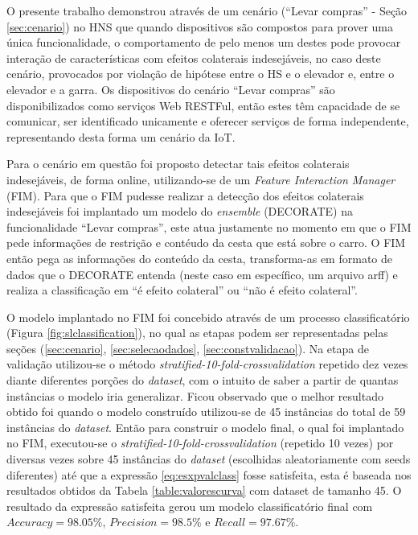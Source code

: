O presente trabalho demonstrou através de um cenário (``Levar compras'' - Seção \ref{sec:cenario}) no HNS que quando dispositivos são compostos para prover uma única funcionalidade, o comportamento de pelo menos um destes pode provocar interação de características com efeitos colaterais indesejáveis, no caso deste cenário, provocados por violação de hipótese entre o HS e o elevador e, entre o elevador e a garra. Os dispositivos do cenário ``Levar compras'' são disponibilizados como serviços Web RESTFul, então estes têm capacidade de se comunicar, ser identificado unicamente e oferecer serviços de forma independente, representando desta forma um cenário da IoT.

Para o cenário em questão foi proposto detectar tais efeitos colaterais indesejáveis, de forma online, utilizando-se de um \textit{Feature Interaction Manager} (FIM). Para que o FIM pudesse realizar a detecção dos efeitos colaterais indesejáveis foi implantado um modelo do \textit{ensemble} (DECORATE) na funcionalidade ``Levar compras'', este atua justamente no momento em que o FIM pede informações de restrição e contéudo da cesta que está sobre o carro. O FIM então pega as informações do conteúdo da cesta, transforma-as em formato de dados que o DECORATE entenda (neste caso em específico, um arquivo arff) e realiza a classificação em ``é efeito colateral'' ou ``não é efeito colateral''. 

O modelo implantado no FIM foi concebido através de um processo classificatório (Figura \ref{fig:slclassification}), no qual as etapas podem ser representadas pelas seções (\ref{sec:cenario}, \ref{sec:selecaodados}, \ref{sec:constvalidacao}). Na etapa de validação utilizou-se o método \textit{stratified-10-fold-crossvalidation} repetido dez vezes diante diferentes porções do \textit{dataset}, com o intuito de saber a partir de quantas instâncias o modelo iria generalizar. Ficou observado que o melhor resultado obtido foi quando o modelo construído utilizou-se de 45 instâncias do total de 59 instâncias do \textit{dataset}. Então para construir o modelo final, o qual foi  implantado no FIM, executou-se o \textit{stratified-10-fold-crossvalidation} (repetido 10 vezes) por diversas vezes sobre 45 instâncias do \textit{dataset} (escolhidas aleatoriamente com seeds diferentes) até que a expressão \ref{eq:esxpvalclass} fosse satisfeita, esta é baseada nos resultados obtidos da Tabela \ref{table:valorescurva} com dataset de tamanho 45. O resultado da expressão satisfeita gerou um modelo classificatório final com $\textit{Accuracy}=98.05\%$, $\textit{Precision}=98.5\%$ e $\textit{Recall}=97.67\%$.

